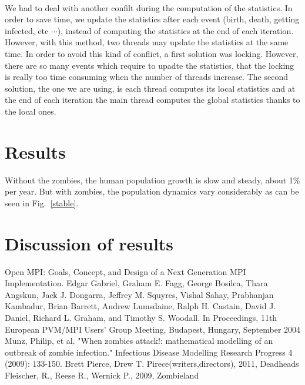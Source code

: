\documentclass{article}
\begin{document}
\paragraph{}
We had to deal with another confilt during the computation of the statistics. In order to save time, we update the statistics after each event (birth, death, getting infected, etc $\cdots$), instead of computing the statistics at the end of each iteration. However, with this method, two threads may update the statistics at the same time. In order to avoid this kind of conflict, a first solution was locking. However, there are so many events which require to upadte the statistics, that the locking is really too time consuming when the number of threads increase. The second solution, the one we are using, is each thread computes its local statistics and at the end of each iteration the main thread computes the global statistics thanks to the local ones.



\section{Results}


Without the zombies, the human population growth is slow and steady, about 1\% per year. But with zombies, the population dynamics vary considerably as can be seen in Fig.~\ref{stable}.



\section{Discussion of results}
\begin{thebibliography}{99}
Open MPI: Goals, Concept, and Design of a Next Generation MPI Implementation. Edgar Gabriel, Graham E. Fagg, George Bosilca, Thara Angskun, Jack J. Dongarra, Jeffrey M. Squyres, Vishal Sahay, Prabhanjan Kambadur, Brian Barrett, Andrew Lumsdaine, Ralph H. Castain, David J. Daniel, Richard L. Graham, and Timothy S. Woodall. In Proceedings, 11th European PVM/MPI Users' Group Meeting, Budapest, Hungary, September 2004
Munz, Philip, et al. "When zombies attack!: mathematical modelling of an outbreak of zombie infection." Infectious Disease Modelling Research Progress 4 (2009): 133-150.
Brett Pierce, Drew T. Pirece(writers,directors), 2011, Deadheads
Fleischer, R., Reese R., Wernick P., 2009, Zombieland 
\end{thebibliography}
\end{document}
